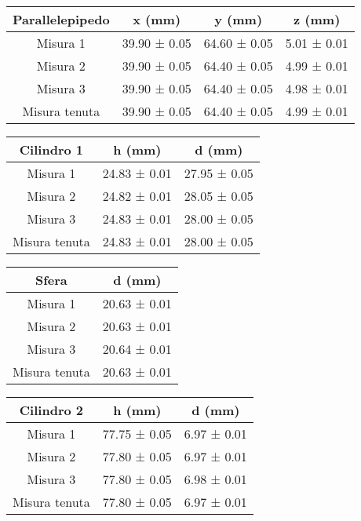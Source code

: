 \documentclass{article}
\begin{document}
\begin{center}
    \begin{tabular}{ |c|c|c|c| }
        \hline
        Parallelepipedo & x (mm) & y (mm) & z (mm) \\
        \hline
        Misura 1 & 39.90 ± 0.05 & 64.60 ± 0.05 & 5.01 ± 0.01 \\
        Misura 2 & 39.90 ± 0.05 & 64.40 ± 0.05 & 4.99 ± 0.01 \\
        Misura 3 & 39.90 ± 0.05 & 64.40 ± 0.05 & 4.98 ± 0.01 \\
        \hline
        Misura tenuta & 39.90 ± 0.05 & 64.40 ± 0.05 & 4.99 ± 0.01 \\
        \hline
    \end{tabular}

    \begin{tabular}{ |c|c|c| }
        \hline
        Cilindro 1 & h (mm) & d (mm) \\
        \hline
        Misura 1 & 24.83 ± 0.01 & 27.95 ± 0.05 \\
        Misura 2 & 24.82 ± 0.01 & 28.05 ± 0.05 \\
        Misura 3 & 24.83 ± 0.01 & 28.00 ± 0.05 \\
        \hline
        Misura tenuta & 24.83 ± 0.01 & 28.00 ± 0.05 \\
        \hline
    \end{tabular}

    \begin{tabular}{ |c|c| }
        \hline
        Sfera & d (mm) \\
        \hline
        Misura 1 & 20.63 ± 0.01 \\
        Misura 2 & 20.63 ± 0.01 \\
        Misura 3 & 20.64 ± 0.01 \\
        \hline
        Misura tenuta & 20.63 ± 0.01 \\
        \hline
    \end{tabular}

    \begin{tabular}{ |c|c|c| }
        \hline
        Cilindro 2 & h (mm) & d (mm) \\
        \hline
        Misura 1 & 77.75 ± 0.05 & 6.97 ± 0.01 \\
        Misura 2 & 77.80 ± 0.05 & 6.97 ± 0.01 \\
        Misura 3 & 77.80 ± 0.05 & 6.98 ± 0.01 \\
        \hline
        Misura tenuta & 77.80 ± 0.05 & 6.97 ± 0.01 \\
        \hline
    \end{tabular}


\end{center}
\end{document}
